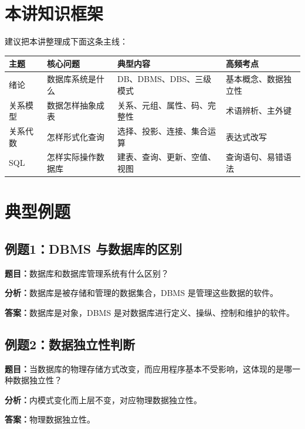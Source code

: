 \documentclass{../../note}
\begin{document}
\section{本讲知识框架}

建议把本讲整理成下面这条主线：

\begin{center}
\begin{tabular}{|>{\centering\arraybackslash}m{1.8cm}|>{\centering\arraybackslash}m{2.6cm}|>{\centering\arraybackslash}m{3.4cm}|>{\centering\arraybackslash}m{3.6cm}|}
\hline
主题 & 核心问题 & 典型内容 & 高频考点 \\
\hline
绪论 & 数据库系统是什么 & DB、DBMS、DBS、三级模式 & 基本概念、数据独立性 \\
\hline
关系模型 & 数据怎样抽象成表 & 关系、元组、属性、码、完整性 & 术语辨析、主外键 \\
\hline
关系代数 & 怎样形式化查询 & 选择、投影、连接、集合运算 & 表达式改写 \\
\hline
SQL & 怎样实际操作数据库 & 建表、查询、更新、空值、视图 & 查询语句、易错语法 \\
\hline
\end{tabular}
\end{center}

\section{典型例题}

\subsection{例题1：DBMS 与数据库的区别}

\textbf{题目：}数据库和数据库管理系统有什么区别？

\textbf{分析：}数据库是被存储和管理的数据集合，DBMS 是管理这些数据的软件。

\textbf{答案：}数据库是对象，DBMS 是对数据库进行定义、操纵、控制和维护的软件。

\subsection{例题2：数据独立性判断}

\textbf{题目：}当数据库的物理存储方式改变，而应用程序基本不受影响，这体现的是哪一种数据独立性？

\textbf{分析：}内模式变化而上层不变，对应物理数据独立性。

\textbf{答案：}物理数据独立性。
\end{document}
